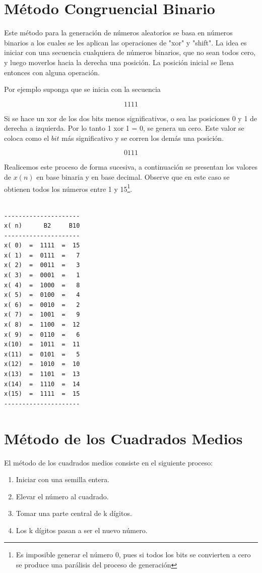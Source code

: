 \section{Método Congruencial Binario}


Este método para la generación de números aleatorios se basa en números binarios a los cuales se les aplican las operaciones de "xor" y "shift". La idea es iniciar con una secuencia cualquiera de números binarios, que no sean todos cero, y luego moverlos hacia la derecha una posición. La posición inicial se llena entonces con alguna operación.

Por ejemplo suponga que se inicia con la secuencia

$$1111$$

Si se hace un xor de los dos bits menos significativos, o sea las posiciones 0 y 1 de derecha a izquierda. Por lo tanto 1 xor 1 = 0, se genera un cero. Este valor se coloca como el $bit$ más significativo y se corren los demás una posición.

$$0111$$

Realicemos este proceso de forma sucesiva, a continuación se presentan los valores de $x(n)$ en base binaria y en base decimal. Observe que en este caso se obtienen todos los números entre 1 y 15\footnote{Es imposible generar el número 0, pues si todos los bits se convierten a cero se produce una parálisis del proceso de generación}.

\begin{verbatim}

---------------------
x( n)      B2     B10
---------------------
x( 0)  =  1111  =  15
x( 1)  =  0111  =   7
x( 2)  =  0011  =   3
x( 3)  =  0001  =   1
x( 4)  =  1000  =   8
x( 5)  =  0100  =   4
x( 6)  =  0010  =   2
x( 7)  =  1001  =   9
x( 8)  =  1100  =  12 
x( 9)  =  0110  =   6
x(10)  =  1011  =  11 
x(11)  =  0101  =   5
x(12)  =  1010  =  10
x(13)  =  1101  =  13
x(14)  =  1110  =  14
x(15)  =  1111  =  15
---------------------

\end{verbatim}

\section{Método de los Cuadrados Medios}

El método de los cuadrados medios consiste en el siguiente proceso:

\begin{enumerate}
\item Iniciar con una semilla entera.
\item Elevar el número al cuadrado.
\item Tomar una parte central de k dígitos.
\item Los k dígitos pasan a ser el nuevo número.
\end{enumerate}

